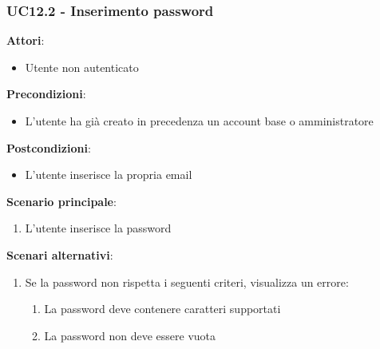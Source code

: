 \subsubsection{UC12.2 - Inserimento password} \label{usecase:12_2}
\textbf{Attori}:
\begin{itemize}
    \item Utente non autenticato
\end{itemize}
\textbf{Precondizioni}:
\begin{itemize}
    \item L'utente ha già creato in precedenza un account base o amministratore
\end{itemize}
\textbf{Postcondizioni}:
\begin{itemize}
    \item L'utente inserisce la propria email
\end{itemize}
\textbf{Scenario principale}:
\begin{enumerate}
    \item L'utente inserisce la password
\end{enumerate}
\textbf{Scenari alternativi}:
\begin{enumerate}
    \item Se la password non rispetta i seguenti criteri, visualizza un errore:
    \begin{enumerate}
        \item La password deve contenere caratteri supportati
        \item La password non deve essere vuota
    \end{enumerate}
\end{enumerate}